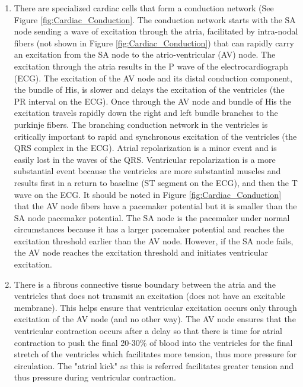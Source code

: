 \begin{enumerate}
    \item There are specialized cardiac cells that form a conduction network (See Figure \ref{fig:Cardiac_Conduction}. The conduction network starts with the SA node sending a wave of excitation through the atria, facilitated by intra-nodal fibers (not shown in Figure \ref{fig:Cardiac_Conduction}) that can rapidly carry an excitation from the SA node to the atrio-ventricular (AV) node. The excitation through the atria results in the P wave of the electrocardiograph (ECG). The excitation of the AV node and its distal conduction component, the bundle of His, is slower and delays the excitation of the ventricles (the PR interval on the ECG). Once through the AV node and bundle of His the excitation travels rapidly down the right and left bundle branches to the purkinje fibers. The branching conduction network in the ventricles is critically important to rapid and synchronous excitation of the ventricles (the QRS complex in the ECG). Atrial repolarization is a minor event and is easily lost in the waves of the QRS. Ventricular repolarization is a more substantial event because the ventricles are more substantial muscles and results first in a return to baseline (ST segment on the ECG), and then the T wave on the ECG. It should be noted in Figure \ref{fig:Cardiac_Conduction} that the AV node fibers have a pacemaker potential but it is smaller than the SA node pacemaker potential. The SA node is the pacemaker under normal circumstances because it has a larger pacemaker potential and reaches the excitation threshold earlier than the AV node. However, if the SA node fails, the AV node reaches the excitation threshold and initiates ventricular excitation.
    \item There is a fibrous connective tissue boundary between the atria and the ventricles that does not transmit an excitation (does not have an excitable membrane). This helps ensure that ventricular excitation occurs only through excitation of the AV node (and no other way). The AV node ensures that the ventricular contraction occurs after a delay so that there is time for atrial contraction to push the final 20-30\% of blood into the ventricles for the final stretch of the ventricles which facilitates more tension, thus more pressure for circulation. The "atrial kick" as this is referred facilitates greater tension and thus pressure during ventricular contraction.

\end{enumerate}

